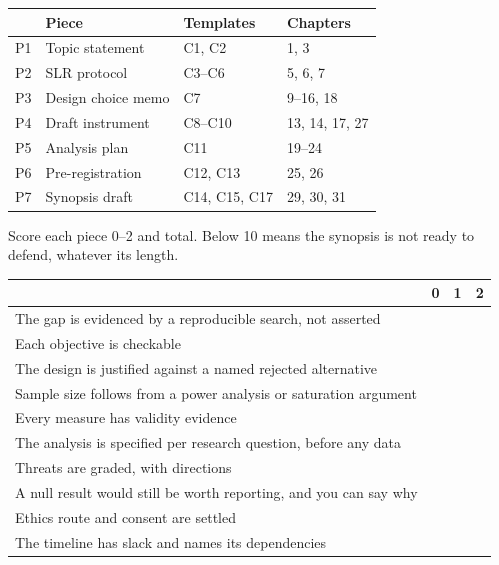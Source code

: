 \begin{center}
\small
\begin{tabular}{@{}L{1.0cm}L{4.4cm}L{4.2cm}L{4.0cm}@{}}
\toprule
 & \textbf{Piece} & \textbf{Templates} & \textbf{Chapters} \\
\midrule
P1 & Topic statement       & C1, C2      & 1, 3 \\
P2 & SLR protocol          & C3--C6      & 5, 6, 7 \\
P3 & Design choice memo    & C7          & 9--16, 18 \\
P4 & Draft instrument      & C8--C10     & 13, 14, 17, 27 \\
P5 & Analysis plan         & C11         & 19--24 \\
P6 & Pre-registration      & C12, C13    & 25, 26 \\
P7 & Synopsis draft        & C14, C15, C17 & 29, 30, 31 \\
\bottomrule
\end{tabular}
\end{center}

\begin{conceptbox}
Score each piece 0--2 and total. Below 10 means the synopsis is not ready to
defend, whatever its length.

\begin{center}
\small
\begin{tabular}{@{}L{11.4cm}ccc@{}}
\toprule
 & \textbf{0} & \textbf{1} & \textbf{2} \\
\midrule
The gap is evidenced by a reproducible search, not asserted & & & \\
Each objective is checkable & & & \\
The design is justified against a named rejected alternative & & & \\
Sample size follows from a power analysis or saturation argument & & & \\
Every measure has validity evidence & & & \\
The analysis is specified per research question, before any data & & & \\
Threats are graded, with directions & & & \\
A null result would still be worth reporting, and you can say why & & & \\
Ethics route and consent are settled & & & \\
The timeline has slack and names its dependencies & & & \\
\bottomrule
\end{tabular}
\end{center}
\end{conceptbox}
